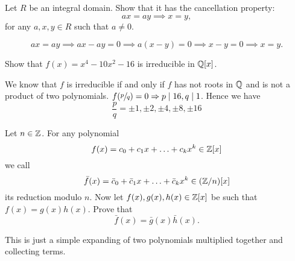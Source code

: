 \question Let $R$ be an integral domain. Show that it has the cancellation property:
\[ ax = ay \implies x = y, \]
for any $a, x, y \in R$ such that $a \neq 0$.
\begin{solution}
    \[ ax = ay \implies ax - ay = 0 \implies a(x - y) = 0 \implies x - y = 0 \implies x = y. \]
\end{solution}

\question
{}

\question Show that $f(x) = x^4 - 10x^2 - 16$ is irreducible in $\mathbb{Q}[x]$.
\begin{solution}
    We know that $f$ is irreducible if and only if $f$ has not roots in $\mathbb{Q}$ and is not a product of two polynomials. $f(\sfrac pq) = 0 \Rightarrow p \mid 16, q \mid 1$. Hence we have
    \[ \frac pq = \pm 1, \pm 2, \pm 4, \pm 8, \pm 16 \]
\end{solution}

\question Let $n \in \mathbb{Z}$. For any polynomial
\[ f(x) = c_0 + c_1 x + \ldots + c_k x^k \in \mathbb{Z}[x] \]
we call
\[ \bar f(x) = \bar c_0 + \bar c_1 x + \ldots + \bar c_k x^k \in (\mathbb{Z}/n)[x] \]
its reduction modulo $n$. Now let $f(x), g(x), h(x) \in \mathbb{Z}[x]$ be such that $f(x) = g(x) h(x)$. Prove that 
\[ \bar f(x) = \bar g(x) \bar h(x). \]
\begin{solution}
    This is just a simple expanding of two polynomials multiplied together and collecting terms.
\end{solution}
